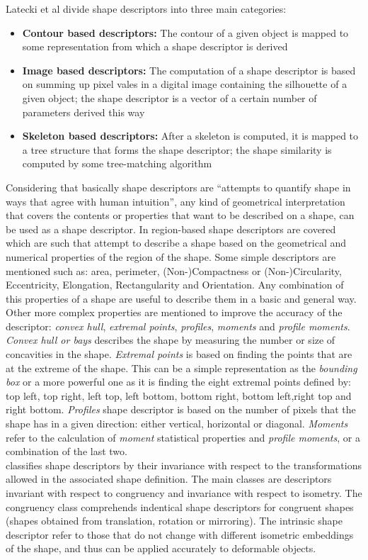 Latecki et al divide shape descriptors into three
main categories: \cite{shapenonrigid}
\begin{itemize}
\item \textbf{Contour based descriptors: }The contour of a given object is 
mapped to some representation from which a shape descriptor is derived
\item \textbf{Image based descriptors: }The computation of a shape descriptor
is based on summing up pixel vales in a digital image containing the silhouette
of a given object; the shape descriptor is a vector of a certain number of
parameters derived this way
\item \textbf{Skeleton based descriptors: }After a skeleton is computed, it is
mapped to a tree structure that forms the shape descriptor; the shape similarity
is computed by some tree-matching algorithm 
\end{itemize}

Considering that basically shape descriptors are ``attempts to quantify shape in 
ways that agree with human intuition''\cite[p.1]{desclecture}, any kind of 
geometrical interpretation that covers the contents or properties that want 
to be described on a shape, can be used as a shape descriptor.
In \cite{desclecture} region-based shape descriptors are covered which are such
that attempt to describe a shape based on the geometrical and numerical properties
of the region of the shape. Some simple descriptors are mentioned such as:
area, perimeter, (Non-)Compactness or (Non-)Circularity, Eccentricity, Elongation,
Rectangularity and Orientation. Any combination of this properties of a shape are
useful to describe them in a basic and general way.
Other more complex properties are mentioned to improve the accuracy of the 
descriptor: \emph{convex hull}, \emph{extremal points}, \emph{profiles},
\emph{ moments} and \emph{profile moments}. \emph{Convex hull or bays} 
describes the shape by measuring the number or size of concavities in the 
shape. \emph{Extremal points} is based on finding the points that
are at the extreme of the shape. This can be a simple representation as the 
\emph{bounding box} or a more powerful one as it is finding the eight extremal
points defined by: top left, top right, left top, left bottom, bottom right,
bottom left,right top and right bottom. \emph{Profiles} shape descriptor 
is based on the number of pixels that the shape has in a given direction:
 either vertical, horizontal or diagonal. \emph{Moments} refer to the
 calculation of \emph{moment} statistical properties and 
\emph{profile moments}, or a combination of the last two.\\
\cite{web:wikishape} classifies shape descriptors by their
invariance with respect to the transformations allowed in the associated
shape definition. The main classes are descriptors invariant with respect 
to congruency and invariance with respect to isometry. The congruency class
comprehends indentical shape descriptors for congruent shapes 
(shapes obtained from
translation, rotation or mirroring). The intrinsic shape descriptor refer
to those that do not change with different isometric embeddings of the shape,
and thus can be applied accurately to deformable objects.

